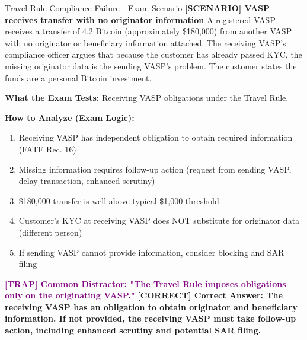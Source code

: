 \documentclass[11pt,a4paper]{beamer}
\newcommand{\trap}[1]{\textcolor{purple}{\textbf{[TRAP] #1}}}
\newcommand{\correct}[1]{\textcolor{green!50!black}{\textbf{[CORRECT] #1}}}
\newcommand{\scenario}[1]{\textcolor{blue!70!black}{\textbf{[SCENARIO] #1}}}
\begin{document}
\begin{frame}{Travel Rule Compliance Failure - Exam Scenario}
	\scenario{VASP receives transfer with no originator information}
	A registered VASP receives a transfer of 4.2 Bitcoin (approximately \$180,000) from another VASP with no originator or beneficiary information attached. The receiving VASP's compliance officer argues that because the customer has already passed KYC, the missing originator data is the sending VASP's problem. The customer states the funds are a personal Bitcoin investment.
	
	\vspace{0.1cm}
	\textbf{What the Exam Tests:} Receiving VASP obligations under the Travel Rule.
	
	\vspace{0.1cm}
	\textbf{How to Analyze (Exam Logic):}
	\begin{enumerate}
		\item Receiving VASP has independent obligation to obtain required information (FATF Rec. 16)
		\item Missing information requires follow-up action (request from sending VASP, delay transaction, enhanced scrutiny)
		\item \$180,000 transfer is well above typical \$1,000 threshold
		\item Customer's KYC at receiving VASP does NOT substitute for originator data (different person)
		\item If sending VASP cannot provide information, consider blocking and SAR filing
	\end{enumerate}
	
	\trap{Common Distractor: "The Travel Rule imposes obligations only on the originating VASP."}
	\correct{Correct Answer: The receiving VASP has an obligation to obtain originator and beneficiary information. If not provided, the receiving VASP must take follow-up action, including enhanced scrutiny and potential SAR filing.}
\end{frame}

\end{document}
